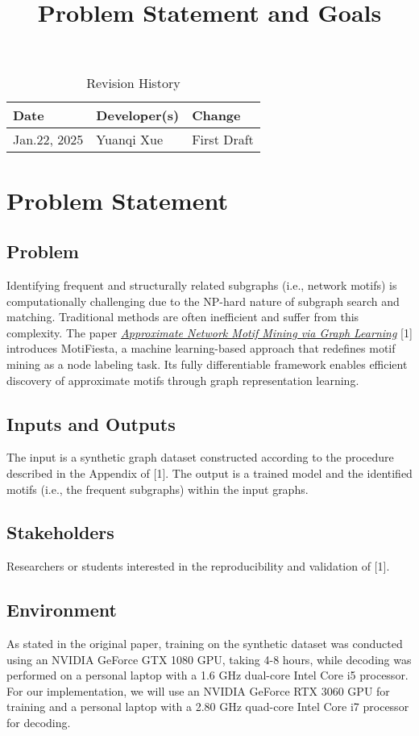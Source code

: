 \documentclass{article}
\title{Problem Statement and Goals}
\author{\authname}
\date{}
\begin{document}
\maketitle

\begin{table}[hp]
\caption{Revision History} \label{TblRevisionHistory}
\begin{tabularx}{\textwidth}{llX}
\toprule
\textbf{Date} & \textbf{Developer(s)} & \textbf{Change}\\
\midrule
Jan.22, 2025 & Yuanqi Xue & First Draft\\
\bottomrule
\end{tabularx}
\end{table}

\section{Problem Statement}
\subsection{Problem}
Identifying frequent and structurally related subgraphs (i.e., network motifs) is computationally challenging due to the NP-hard nature of subgraph search and matching. Traditional methods are often inefficient and suffer from this complexity. The paper  \href{https://arxiv.org/abs/2206.01008}{\textit{Approximate Network Motif Mining via Graph Learning}} [1] introduces MotiFiesta, a machine learning-based approach that redefines motif mining as a node labeling task. Its fully differentiable framework enables efficient discovery of approximate motifs through graph representation learning.

\subsection{Inputs and Outputs}
The input is a synthetic graph dataset constructed according to the procedure described in the Appendix of [1]. The output is a trained model and the identified motifs (i.e., the frequent subgraphs) within the input graphs.


\subsection{Stakeholders}
Researchers or students interested in the reproducibility and validation of [1].

\subsection{Environment}
As stated in the original paper, training on the synthetic dataset was conducted using an NVIDIA GeForce GTX 1080 GPU, taking 4-8 hours, while decoding was performed on a personal laptop with a 1.6 GHz dual-core Intel Core i5 processor. For our implementation, we will use an NVIDIA GeForce RTX 3060 GPU for training and a personal laptop with a 2.80 GHz quad-core Intel Core i7 processor for decoding.
\end{document}
